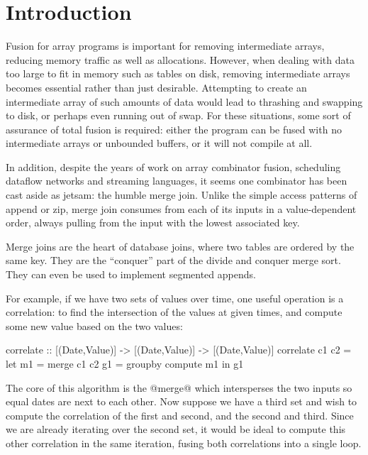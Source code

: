 \section{Introduction}
\label{s:Introduction}

Fusion for array programs is important for removing intermediate arrays, reducing memory traffic as well as allocations.
However, when dealing with data too large to fit in memory such as tables on disk, removing intermediate arrays becomes essential rather than just desirable.
Attempting to create an intermediate array of such amounts of data would lead to thrashing and swapping to disk, or perhaps even running out of swap.
For these situations, some sort of assurance of total fusion is required: either the program can be fused with no intermediate arrays or unbounded buffers, or it will not compile at all.

In addition, despite the years of work on array combinator fusion, scheduling dataflow networks and streaming languages, it seems one combinator has been cast aside as jetsam: the humble merge join.
Unlike the simple access patterns of append or zip, merge join consumes from each of its inputs in a value-dependent order, always pulling from the input with the lowest associated key.

Merge joins are the heart of database joins, where two tables are ordered by the same key.
They are the ``conquer'' part of the divide and conquer merge sort.
They can even be used to implement segmented appends.


For example, if we have two sets of values over time, one useful operation is a correlation: to find the intersection of the values at given times, and compute some new value based on the two values:
\begin{code}
correlate :: [(Date,Value)] -> [(Date,Value)]
          -> [(Date,Value)]
correlate c1 c2
 = let m1 = merge c1 c2
       g1 = groupby compute m1
   in  g1
\end{code}

The core of this algorithm is the @merge@ which intersperses the two inputs so equal dates are next to each other.
Now suppose we have a third set and wish to compute the correlation of the first and second, and the second and third.
Since we are already iterating over the second set, it would be ideal to compute this other correlation in the same iteration, fusing both correlations into a single loop.

